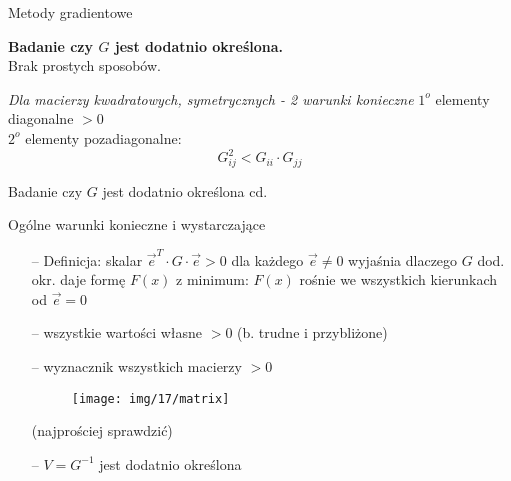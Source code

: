   \begin{frame}{Metody gradientowe}

   \begin{alertblock}{}
     \textbf{Badanie czy $G$ jest dodatnio określona.}\\
     Brak prostych sposobów.
    \end{alertblock}
    \begin{block}{\emph{Dla macierzy kwadratowych, symetrycznych - 2 warunki konieczne}}
      $1^o$ elementy diagonalne $> 0$ \ %
     \\$2^o$ elementy pozadiagonalne:
     \begin{displaymath}
      	G_{ij}^2 < G_{ii} \cdot G_{jj}
     \end{displaymath}
    \end{block}

  \end{frame}

  \begin{frame}{Badanie czy $G$ jest dodatnio określona cd.}

   \begin{block}{Ogólne warunki konieczne i wystarczające}
     \begin{itemize}
      	\item[--] Definicja: skalar $\vec{e}^T \cdot G \cdot \vec{e} > 0$ dla każdego $\vec{e}\ne 0$  wyjaśnia dlaczego $G$ dod.
			okr. daje formę $F(x)$ z minimum: $F(x)$ rośnie we wszystkich kierunkach od $\vec{e} = 0$
			\item[--] wszystkie wartości własne $> 0$ (b. trudne i przybliżone)
      		\item[--] wyznacznik wszystkich macierzy $> 0$
      		\begin{figure}
				\centering				\texttt{[image: img/17/matrix]}
			\end{figure}
			(najprościej sprawdzić)
			
			\item[--] $V = G^{-1}$ jest dodatnio określona
      \end{itemize}
    \end{block}

  \end{frame}

